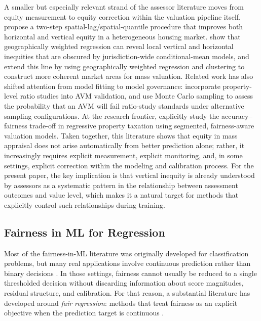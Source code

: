 \documentclass[12pt, draft]{article}
\theoremstyle{plain}
\theoremstyle{definition}
\newcommand{\1}{\mathbf{1}}
\begin{document}
A smaller but especially relevant strand of the assessor literature moves from equity measurement to equity correction within the valuation pipeline itself. \textcite{Quintos2014} propose a two-step spatial-lag/spatial-quantile procedure that improves both horizontal and vertical equity in a heterogeneous housing market. \textcite{BidansetEtAl2019} show that geographically weighted regression can reveal local vertical and horizontal inequities that are obscured by jurisdiction-wide conditional-mean models, and \textcite{BidansetEtAl2025} extend this line by using geographically weighted regression and clustering to construct more coherent market areas for mass valuation. Related work has also shifted attention from model fitting to model governance: \textcite{HermansEtAl2022} incorporate property-level ratio studies into AVM validation, and \textcite{HermansEtAl2025} use Monte Carlo sampling to assess the probability that an AVM will fail ratio-study standards under alternative sampling configurations. At the research frontier, \textcite{CandoganHanLu2023} explicitly study the accuracy--fairness trade-off in regressive property taxation using segmented, fairness-aware valuation models. Taken together, this literature shows that equity in mass appraisal does not arise automatically from better prediction alone; rather, it increasingly requires explicit measurement, explicit monitoring, and, in some settings, explicit correction within the modeling and calibration process. For the present paper, the key implication is that vertical inequity is already understood by assessors as a systematic pattern in the relationship between assessment outcomes and value level, which makes it a natural target for methods that explicitly control such relationships during training.

\subsection{Fairness in ML for Regression}

Most of the fairness-in-ML literature was originally developed for classification problems, but many real applications involve continuous prediction rather than binary decisions \cite{CatonHaas2024,BarocasHardtNarayanan2023}. In those settings, fairness cannot usually be reduced to a single thresholded decision without discarding information about score magnitudes, residual structure, and calibration. For that reason, a substantial literature has developed around \emph{fair regression}: methods that treat fairness as an explicit objective when the prediction target is continuous \cite{AgarwalDudikWu2019,FitzsimonsEtAl2019,ChzhenEtAl2020Wasserstein,ChzhenEtAl2020Recalibration,WeiEtAl2023}.
\end{document}
